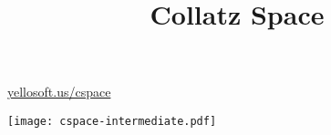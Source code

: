 \documentclass[b1,portrait]{sciposter}
\title{Collatz Space}
\begin{document}
\maketitle

\begin{center}
\href{http://www.yellosoft.us/cspace}{yellosoft.us/cspace}
\end{center}

\vspace*{\fill}
\begin{center}
\texttt{[image: cspace-intermediate.pdf]}
\end{center}
\vspace*{\fill}
\end{document}

